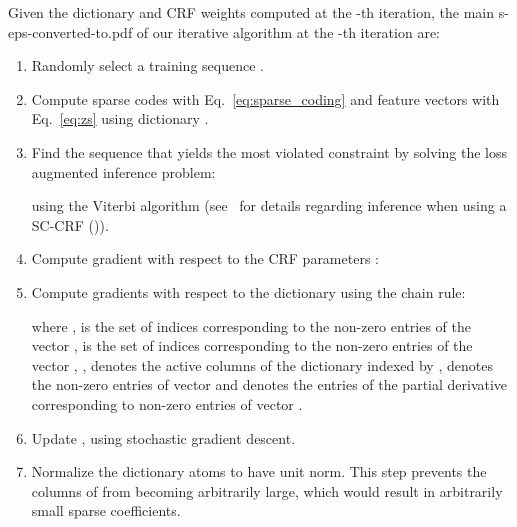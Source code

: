 \documentclass[10pt,twocolumn,letterpaper]{article}
\begin{document}
Given the dictionary and CRF weights computed at the -th iteration, the main s-eps-converted-to.pdf of our iterative algorithm at the -th iteration are:
\begin{enumerate}
\item Randomly select a training sequence .
\item Compute sparse codes  with Eq.~\ref{eq:sparse_coding} and feature vectors  with Eq.~\ref{eq:zs} using dictionary . 
\item Find the sequence  that yields the most violated constraint by solving the loss augmented inference problem:

using the Viterbi algorithm (see~\cite{Lea:ICRA16} for details regarding inference when using a SC-CRF ()).
\item Compute gradient with respect to the CRF parameters :


\item Compute gradients with respect to the dictionary  using the chain rule:

where ,  is the set of indices corresponding to the non-zero entries of the vector ,  is the set of indices corresponding to the non-zero entries of the vector , ,  denotes the active columns of the dictionary indexed by ,  denotes the non-zero entries of vector  and  denotes the entries of the partial derivative corresponding to non-zero entries of vector .
\item Update ,  using stochastic gradient descent.

\item Normalize the dictionary atoms to have unit  norm.
This step prevents the columns of  from becoming arbitrarily large, which would result in arbitrarily small sparse coefficients. 
\end{enumerate}
\end{document}
